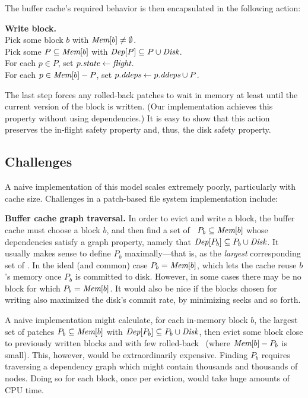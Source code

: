 The buffer cache's required behavior is then encapsulated in the following
action:

\begin{tabbing}
\textbf{Write block.} \\
\quad Pick some block $b$ with $\PMem[b] \neq \emptyset$. \\
\quad Pick some $P \subseteq \PMem[b]$ with $\PDepset{P} \subseteq P \cup
\PDisk$. \\
\quad For each $p \in P$, set $p.\textit{state} \gets \textit{flight}$. \\
\quad For each $p \in \PMem[b]-P$, set $\PDDepset{p} \gets \PDDepset{p}
\cup P$.
\end{tabbing}

\noindent
%
The last step forces any rolled-back patches to wait in memory at least
until the current version of the block is written.  (Our implementation
achieves this property without using dependencies.)
%
It is easy to show that this action preserves the in-flight safety property
and, thus, the disk safety property.


\subsection{Challenges}

A naive implementation of this model scales extremely poorly,
particularly with cache size.
%
Challenges in a patch-based file system implementation include:

\textbf{Buffer cache graph traversal.}
%
In order to evict and write a block, the buffer cache must choose a block
$b$,
%
and then find a set of \patches\ $P_b \subseteq \PMem[b]$ whose dependencies
satisfy a graph property, namely that $\PDepset{P_b} \subseteq P_b \cup
\PDisk$.
%
It usually makes sense to define $P_b$ maximally---that is, as the
\emph{largest} corresponding set of \patches.
%
In the ideal (and common) case $P_b = \PMem[b]$, which lets the cache reuse
$b$'s memory once $P_b$ is committed to disk.  However, in some cases there
may be no block for which $P_b = \PMem[b]$.
%
It would also be nice if the blocks chosen for writing also maximized the
disk's commit rate, by minimizing seeks and so forth.

A naive implementation might calculate, for each in-memory block $b$, the
largest set of patches $P_b \subseteq \PMem[b]$ with $\PDepset{P_b}
\subseteq P_b \cup \PDisk$, then evict some block close to previously
written blocks and with few rolled-back \patches\ (where $\PMem[b] - P_b$
is small).
%
This, however, would be extraordinarily expensive.
%
Finding $P_b$ requires traversing a dependency graph which might contain
thousands and thousands of nodes.
%
Doing so for each block, once per eviction, would take huge amounts of CPU
time.


